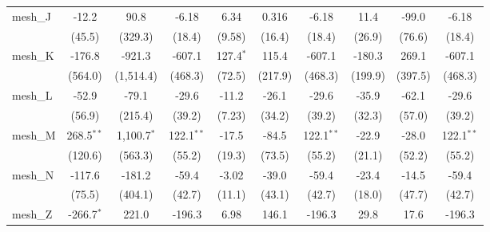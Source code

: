 \begin{tabular}{lccccccccc}
   mesh\_J                                                     & -12.2            & 90.8            & -6.18          & 6.34          & 0.316         & -6.18          & 11.4          & -99.0         & -6.18\\   
                                                               & (45.5)           & (329.3)         & (18.4)         & (9.58)        & (16.4)        & (18.4)         & (26.9)        & (76.6)        & (18.4)\\   
   mesh\_K                                                     & -176.8           & -921.3          & -607.1         & 127.4$^{*}$   & 115.4         & -607.1         & -180.3        & 269.1         & -607.1\\   
                                                               & (564.0)          & (1,514.4)       & (468.3)        & (72.5)        & (217.9)       & (468.3)        & (199.9)       & (397.5)       & (468.3)\\   
   mesh\_L                                                     & -52.9            & -79.1           & -29.6          & -11.2         & -26.1         & -29.6          & -35.9         & -62.1         & -29.6\\   
                                                               & (56.9)           & (215.4)         & (39.2)         & (7.23)        & (34.2)        & (39.2)         & (32.3)        & (57.0)        & (39.2)\\   
   mesh\_M                                                     & 268.5$^{**}$     & 1,100.7$^{*}$   & 122.1$^{**}$   & -17.5         & -84.5         & 122.1$^{**}$   & -22.9         & -28.0         & 122.1$^{**}$\\   
                                                               & (120.6)          & (563.3)         & (55.2)         & (19.3)        & (73.5)        & (55.2)         & (21.1)        & (52.2)        & (55.2)\\   
   mesh\_N                                                     & -117.6           & -181.2          & -59.4          & -3.02         & -39.0         & -59.4          & -23.4         & -14.5         & -59.4\\   
                                                               & (75.5)           & (404.1)         & (42.7)         & (11.1)        & (43.1)        & (42.7)         & (18.0)        & (47.7)        & (42.7)\\   
   mesh\_Z                                                     & -266.7$^{*}$     & 221.0           & -196.3         & 6.98          & 146.1         & -196.3         & 29.8          & 17.6          & -196.3\\   

\end{tabular}
